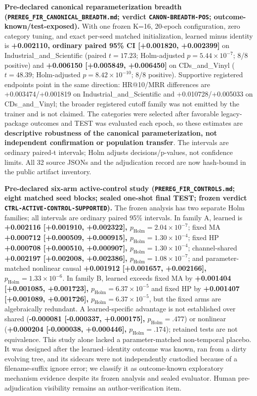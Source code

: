 \textbf{Pre-declared canonical reparameterization breadth (\texttt{PREREG\_FIR\_CANONICAL\_BREADTH.md}; verdict \texttt{CANON-BREADTH-POS}; outcome-known/test-exposed).} With one frozen K=16, 20-epoch configuration, zero category tuning, and exact per-seed matched initialization, learned minus identity is \textbf{+0.002110, ordinary paired 95\% CI [+0.001820, +0.002399]} on Industrial\_and\_Scientific (paired $t=17.23$; Holm-adjusted $p=5.44\times10^{-7}$; 8/8 positive) and \textbf{+0.006150 [+0.005849, +0.006450]} on CDs\_and\_Vinyl ($t=48.39$; Holm-adjusted $p=8.42\times10^{-10}$; 8/8 positive). Supportive registered endpoints point in the same direction: HR@10/MRR differences are +0.003474/+0.001819 on Industrial\_and\_Scientific and +0.010728/+0.005033 on CDs\_and\_Vinyl; the broader registered cutoff family was not emitted by the trainer and is not claimed. The categories were selected after favorable legacy-package outcomes and TEST was evaluated each epoch, so these estimates are \textbf{descriptive robustness of the canonical parameterization, not independent confirmation or population transfer}. The intervals are ordinary paired-t intervals; Holm adjusts decisions/p-values, not confidence limits. All 32 source JSONs and the adjudication record are now hash-bound in the public artifact inventory.

\textbf{Pre-declared six-arm active-control study (\texttt{PREREG\_FIR\_CONTROLS.md}; eight matched seed blocks; sealed one-shot final TEST; frozen verdict \texttt{CTRL-ACTIVE-CONTROL-SUPPORTED}).} The frozen analysis has two separate Holm families; all intervals are ordinary paired 95\% intervals. In family A, learned is \textbf{+0.002116 [+0.001910, +0.002322], $p_{\mathrm{Holm}}=2.04\times10^{-7}$}; fixed MA \textbf{+0.000712 [+0.000509, +0.000915], $p_{\mathrm{Holm}}=1.30\times10^{-4}$}; fixed HP \textbf{+0.000708 [+0.000510, +0.000907], $p_{\mathrm{Holm}}=1.30\times10^{-4}$}; channel-shared \textbf{+0.002197 [+0.002008, +0.002386], $p_{\mathrm{Holm}}=1.08\times10^{-7}$}; and parameter-matched nonlinear causal \textbf{+0.001912 [+0.001657, +0.002166], $p_{\mathrm{Holm}}=1.33\times10^{-6}$}. In family B, learned exceeds fixed MA by \textbf{+0.001404 [+0.001085, +0.001723], $p_{\mathrm{Holm}}=6.37\times10^{-5}$} and fixed HP by \textbf{+0.001407 [+0.001089, +0.001726], $p_{\mathrm{Holm}}=6.37\times10^{-5}$}, but the fixed arms are algebraically redundant. A learned-specific advantage is not established over shared (\textbf{-0.000081 [-0.000337, +0.000175], $p_{\mathrm{Holm}}=.477$}) or nonlinear (\textbf{+0.000204 [-0.000038, +0.000446], $p_{\mathrm{Holm}}=.174$}); retained tests are not equivalence. This study alone lacked a parameter-matched non-temporal placebo. It was designed after the learned--identity outcome was known, ran from a dirty evolving tree, and its sidecars were not independently custodied because of a filename-suffix ignore error; we classify it as outcome-known exploratory mechanism evidence despite its frozen analysis and sealed evaluator. Human pre-adjudication visibility remains an author-verification item.

